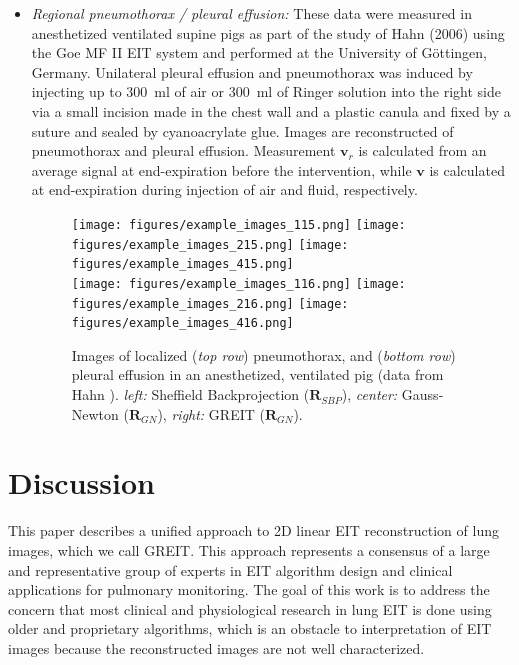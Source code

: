 \documentclass[12pt]{iopart}
\newcommand{\vB}{\mbox{$\mathbf{v}$}}
\newcommand{\RB}{\mbox{$\mathbf{R}$}}
\begin{document}
\begin{itemize}
\item
{\em Regional pneumothorax / pleural effusion:}
These data were measured in anesthetized
ventilated supine pigs as part of the
study of Hahn \etal (2006) using the
Goe MF II EIT system and performed at the
University of G\"ottingen, Germany.
Unilateral pleural effusion and pneumothorax was
induced by injecting up to $300$~ml of air or $300$~ml of
Ringer solution into the right side via a small incision
made in the chest wall and a plastic canula and
fixed by a suture and sealed by cyanoacrylate glue.
Images are reconstructed of pneumothorax
and pleural effusion.
Measurement $\vB_r$ is calculated from an
average signal at end-expiration before
the intervention, while $\vB$ is calculated
at end-expiration during injection of air
and fluid, respectively.

\begin{figure}[bhtp]
\begin{center}
\texttt{[image: figures/example\_images\_115.png]}
\texttt{[image: figures/example\_images\_215.png]}
\texttt{[image: figures/example\_images\_415.png]}
\\
\texttt{[image: figures/example\_images\_116.png]}
\texttt{[image: figures/example\_images\_216.png]}
\texttt{[image: figures/example\_images\_416.png]}
\caption{
\label{fig:Frerichs98images}
Images of localized
({\em top row})
pneumothorax, and
({\em bottom row})
pleural effusion
in an anesthetized, ventilated pig 
(data from Hahn ).
{\em left:} Sheffield Backprojection ($\RB_{SBP}$),
{\em center:} Gauss-Newton ($\RB_{GN}$),
{\em right:} GREIT ($\RB_{GN}$).
}
\end{center}
\end{figure}


\end{itemize}


\section{Discussion}

This paper describes a unified approach to 2D linear EIT
reconstruction of lung images, which we call GREIT.
This approach represents
a consensus of a large and representative
group of experts in EIT algorithm design and clinical
applications for pulmonary monitoring. The goal of
this work is to address the concern that most
clinical and physiological research in lung EIT
is done using older and proprietary algorithms, which is
an obstacle to interpretation of EIT images because the
reconstructed images are not well characterized.
\end{document}
